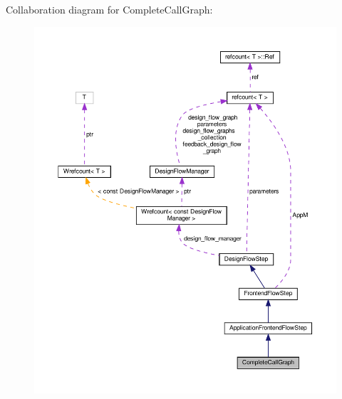 Collaboration diagram for Complete\+Call\+Graph\+:
\nopagebreak
\begin{figure}[H]
\begin{center}
\leavevmode
\includegraphics[width=350pt]{d1/d2a/classCompleteCallGraph__coll__graph}
\end{center}
\end{figure}
